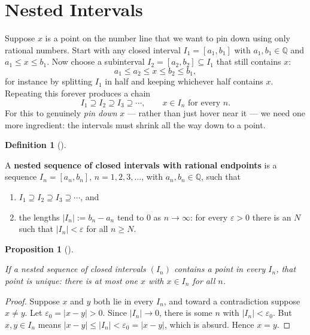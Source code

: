 \documentclass[
  letterpaper,
  DIV=11,
  numbers=noendperiod]{scrreprt}
\providecommand{\tightlist}{%
  \setlength{\itemsep}{0pt}\setlength{\parskip}{0pt}}
\theoremstyle{plain}
\theoremstyle{plain}
\newtheorem{proposition}{Proposition}[chapter]
\theoremstyle{definition}
\newtheorem{definition}{Definition}[chapter]
\theoremstyle{definition}
\theoremstyle{definition}
\theoremstyle{plain}
\theoremstyle{plain}
\theoremstyle{remark}
\begin{document}
\section{Nested Intervals}\label{nested-intervals}

Suppose \(x\) is a point on the number line that we want to pin down
using only rational numbers. Start with any closed interval
\(I_1 = [a_1,b_1]\) with \(a_1,b_1\in\mathbb{Q}\) and
\(a_1 \le x \le b_1\). Now choose a subinterval
\(I_2 = [a_2,b_2] \subseteq I_1\) that still contains \(x\): \[
a_1 \le a_2 \le x \le b_2 \le b_1,
\] for instance by splitting \(I_1\) in half and keeping whichever half
contains \(x\). Repeating this forever produces a chain \[
I_1 \supseteq I_2 \supseteq I_3 \supseteq \cdots, \qquad x \in I_n \text{ for every } n.
\] For this to genuinely \emph{pin down} \(x\) --- rather than just
hover near it --- we need one more ingredient: the intervals must shrink
all the way down to a point.

\begin{definition}[]\protect\hypertarget{def-nested-intervals}{}\label{def-nested-intervals}

\hfill\break
A \textbf{nested sequence of closed intervals with rational endpoints}
is a sequence \(I_n = [a_n,b_n]\), \(n=1,2,3,\dots\), with
\(a_n,b_n\in\mathbb{Q}\), such that

\begin{enumerate}
\def\labelenumi{\arabic{enumi}.}
\tightlist
\item
  \(I_1 \supseteq I_2 \supseteq I_3 \supseteq \cdots\), and
\item
  the lengths \(|I_n| := b_n - a_n\) tend to \(0\) as \(n\to\infty\):
  for every \(\varepsilon>0\) there is an \(N\) such that
  \(|I_n| < \varepsilon\) for all \(n \ge N\).
\end{enumerate}

\end{definition}

\begin{proposition}[]\protect\hypertarget{prp-nested-unique}{}\label{prp-nested-unique}

\hfill\break
If a nested sequence of closed intervals \((I_n)\) contains a point in
every \(I_n\), that point is unique: there is at most one \(x\) with
\(x\in I_n\) for all \(n\).

\end{proposition}

\begin{proof}
Suppose \(x\) and \(y\) both lie in every \(I_n\), and toward a
contradiction suppose \(x\neq y\). Let \(\varepsilon_0 = |x-y| > 0\).
Since \(|I_n|\to 0\), there is some \(n\) with
\(|I_n| < \varepsilon_0\). But \(x,y\in I_n\) means
\(|x-y| \le |I_n| < \varepsilon_0 = |x-y|\), which is absurd. Hence
\(x=y\).
\end{proof}
\end{document}
